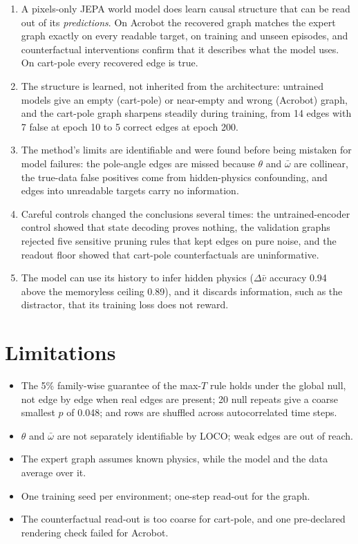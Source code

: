 \documentclass[11pt, a4paper, oneside,enumerate,textcomp]{report}
\newcommand{\vb}{\bar{v}}
\newcommand{\wb}{\bar{\omega}}
\newcommand{\dd}{\Delta}
\begin{document}
\begin{enumerate}
	\item A pixels-only JEPA world model does learn causal structure that can be read out of its \emph{predictions}. On Acrobot the recovered graph matches the expert graph exactly on every readable target, on training and unseen episodes, and counterfactual interventions confirm that it describes what the model uses. On cart-pole every recovered edge is true.
	\item The structure is learned, not inherited from the architecture: untrained models give an empty (cart-pole) or near-empty and wrong (Acrobot) graph, and the cart-pole graph sharpens steadily during training, from 14 edges with 7 false at epoch 10 to 5 correct edges at epoch 200.
	\item The method's limits are identifiable and were found before being mistaken for model failures: the pole-angle edges are missed because $\theta$ and $\wb$ are collinear, the true-data false positives come from hidden-physics confounding, and edges into unreadable targets carry no information.
	\item Careful controls changed the conclusions several times: the untrained-encoder control showed that state decoding proves nothing, the validation graphs rejected five sensitive pruning rules that kept edges on pure noise, and the readout floor showed that cart-pole counterfactuals are uninformative.
	\item The model can use its history to infer hidden physics ($\dd\vb$ accuracy 0.94 above the memoryless ceiling 0.89), and it discards information, such as the distractor, that its training loss does not reward.
\end{enumerate}

\section{Limitations}

\begin{itemize}
	\item The 5\% family-wise guarantee of the max-$T$ rule holds under the global null, not edge by edge when real edges are present; 20 null repeats give a coarse smallest $p$ of 0.048; and rows are shuffled across autocorrelated time steps.
	\item $\theta$ and $\wb$ are not separately identifiable by LOCO; weak edges are out of reach.
	\item The expert graph assumes known physics, while the model and the data average over it.
	\item One training seed per environment; one-step read-out for the graph.
	\item The counterfactual read-out is too coarse for cart-pole, and one pre-declared rendering check failed for Acrobot.
\end{itemize}
\end{document}
